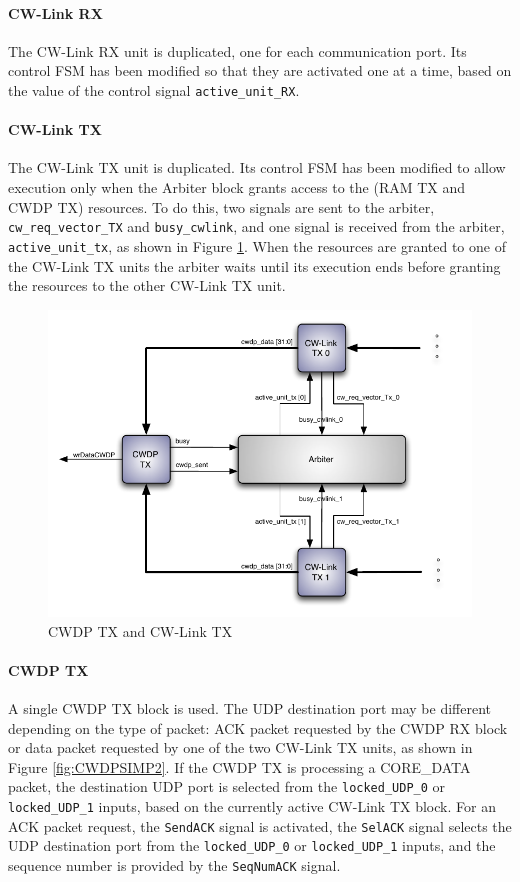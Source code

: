 \documentclass[defaultstyle,10pt,master,Helvetica]{thesis}
\begin{document}
\paragraph*{CW-Link RX} The CW-Link RX unit is duplicated, one for each communication port. Its control \ac{FSM} has been modified so that they are activated one at a time, based on the value of the control signal {\tt active\_unit\_RX}.

\paragraph*{CW-Link TX} The CW-Link TX unit is duplicated. Its control \ac{FSM} has been modified to allow execution only when the Arbiter block grants access to the (\acs{RAM} TX and \ac{CWDP} TX) resources. To do this, two signals are sent to the arbiter, \texttt{cw\_req\_vector\_TX} and \texttt{busy\_cwlink}, and one signal is received from the arbiter, \texttt{active\_unit\_tx}, as shown in Figure \ref{fig:CWDP-TX}. When the resources are granted to one of the CW-Link TX units the arbiter waits until its execution ends before granting the resources to the other CW-Link TX unit.

\begin{figure}[h]
  \centering
      \includegraphics[scale=1.2,center]{Diagrams/CWDP-TX-Detail.pdf}
  \caption{\ac{CWDP} TX and CW-Link TX}\label{fig:CWDP-TX}
\end{figure}

\paragraph*{CWDP TX} A single \ac{CWDP} TX block is used. The \ac{UDP} destination port may be different depending on the type of packet: \ac{ACK} packet requested by the \ac{CWDP} RX block or data packet requested by one of the two CW-Link TX units, as shown in Figure \ref{fig:CWDPSIMP2}. If the \ac{CWDP} TX is processing a CORE\_DATA packet, the destination \ac{UDP} port is selected from the \texttt{locked\_UDP\_0} or \texttt{locked\_UDP\_1} inputs, based on the currently active CW-Link TX block. For an \ac{ACK} packet request, the {\tt SendACK} signal is activated, the {\tt SelACK} signal selects the \ac{UDP} destination port from the \texttt{locked\_UDP\_0} or \texttt{locked\_UDP\_1} inputs, and the sequence number is provided by the {\tt SeqNumACK} signal.
\end{document}
